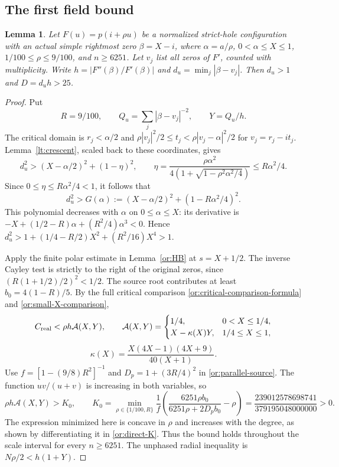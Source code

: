 \documentclass[11pt,reqno]{amsart}
\numberwithin{equation}{section}
\newtheorem{lemma}[theorem]{Lemma}
\theoremstyle{definition}
\theoremstyle{remark}
\begin{document}
\subsection{The first field bound}

\begin{lemma}\label{sm:normalized-D25}
Let $F(u)=p(i+\rho u)$ be a normalized strict-hole configuration
with an actual simple rightmost zero $\beta=X-i$, where
$\alpha=a/\rho$, $0<\alpha\le X\le1$,
$1/100\le\rho\le9/100$, and $n\ge6251$.
Let $v_j$ list all zeros of $F'$, counted with multiplicity.
Write $h=|F''(\beta)/F'(\beta)|$ and
$d_u=\min_j|\beta-v_j|$. Then $d_u>1$ and $D=d_uh>25$.
\end{lemma}
\begin{proof}
Put
\[
 R=9/100,\qquad Q_u=\sum_j|\beta-v_j|^{-2},\qquad Y=Q_u/h.
\]
The critical domain is
$r_j<\alpha/2$ and
$\rho|v_j|^2/2\le t_j<\rho|v_j-\alpha|^2/2$ for
$v_j=r_j-it_j$. Lemma~\ref{lt:crescent}, scaled back to these
coordinates, gives
\[
 d_u^2>(X-\alpha/2)^2+(1-\eta)^2,\qquad
 \eta=\frac{\rho\alpha^2}{4(1+\sqrt{1-\rho^2\alpha^2/4})}
       \le R\alpha^2/4.
\]
Since $0\le\eta\le R\alpha^2/4<1$, it follows that
\[
 d_u^2>G(\alpha):=(X-\alpha/2)^2+(1-R\alpha^2/4)^2.
\]
This polynomial decreases with $\alpha$ on $0\le\alpha\le X$:
its derivative is
$-X+(1/2-R)\alpha+(R^2/4)\alpha^3<0$.
Hence $d_u^2>1+(1/4-R/2)X^2+(R^2/16)X^4>1$.

Apply the finite polar estimate in Lemma~\ref{or:HB} at
$s=X+1/2$. The inverse Cayley test is strictly to the right of
the original zeros, since $(R(1+1/2)/2)^2<1/2$.
The source root contributes at least
$b_0=4(1-R)/5$. By the full critical comparison
\eqref{or:critical-comparison-formula} and
\eqref{or:small-X-comparison},
\[
 C_{\rm real}<\rho h\mathcal A(X,Y),\qquad
 \mathcal A(X,Y)=
 \begin{cases}1/4,&0<X\le1/4,\\
 X-\kappa(X)Y,&1/4\le X\le1,
 \end{cases}
\]
\[
 \kappa(X)=\frac{X(4X-1)(4X+9)}{40(X+1)}.
\]
Use $f=[1-(9/8)R^2]^{-1}$ and $D_p=1+(3R/4)^2$ in
\eqref{or:parallel-source}. The function $uv/(u+v)$ is increasing
in both variables, so
\begin{equation}\label{sm:normalized-source}
 \rho h\mathcal A(X,Y)>K_0,\qquad
 K_0=\min_{\rho\in\{1/100,R\}}
 \frac1f\left(\frac{6251\rho b_0}{6251\rho+2D_pb_0}-\rho\right)
 =\frac{239012578698741}{379195048000000}>0.
\end{equation}
The expression minimized here is concave in $\rho$
and increases with the degree, as shown by differentiating it in
\eqref{or:direct-K}. Thus the bound holds throughout the scale interval
for every $n\ge6251$. The unphased radial inequality is
$N\rho/2<h(1+Y)$.


\end{proof}
\end{document}
